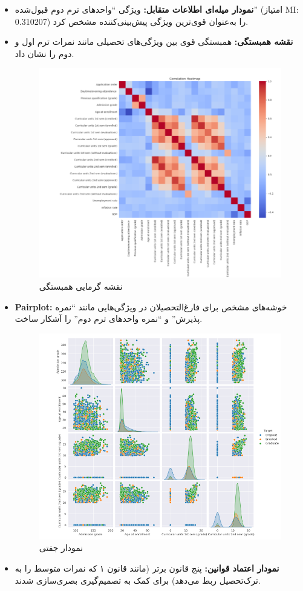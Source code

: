 \begin{itemize}
	\item \textbf{نمودار میله‌ای اطلاعات متقابل:} ویژگی ``واحدهای ترم دوم قبول‌شده'' (امتیاز MI: 0.310207) را به‌عنوان قوی‌ترین ویژگی پیش‌بینی‌کننده مشخص کرد.
	
	\item \textbf{نقشه همبستگی:} همبستگی قوی بین ویژگی‌های تحصیلی مانند نمرات ترم اول و دوم را نشان داد.
	\begin{figure}[H]
		\centering
		\includegraphics[width=0.7\linewidth]{img/heat}
		\caption{نقشه گرمایی همبستگی}
		\label{fig:heat}
	\end{figure}
	
	\item \textbf{Pairplot:} خوشه‌های مشخص برای فارغ‌التحصیلان در ویژگی‌هایی مانند ``نمره پذیرش'' و ``نمره واحدهای ترم دوم'' را آشکار ساخت.
	\begin{figure}[H]
		\centering
		\includegraphics[width=0.7\linewidth]{img/pp}
		\caption{نمودار جفتی}
		\label{fig:pp}
	\end{figure}
	
	\item \textbf{نمودار اعتماد قوانین:} پنج قانون برتر (مانند قانون ۱ که نمرات متوسط را به ترک‌تحصیل ربط می‌دهد) برای کمک به تصمیم‌گیری بصری‌سازی شدند.
\end{itemize}

